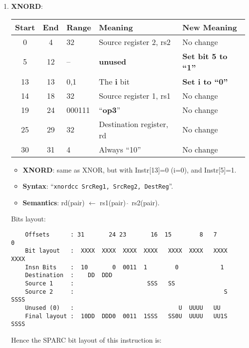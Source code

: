\begin{enumerate}
\item \textbf{XNORD}:\\
  \begin{center}
    \begin{tabular}[p]{|c|c|l|l|l|}
      \hline
      \textbf{Start} & \textbf{End} & \textbf{Range} & \textbf{Meaning} &
                                                                          \textbf{New Meaning}\\
      \hline
      0 & 4 & 32 & Source register 2, rs2 & No change \\
      5 & 12 & -- & \textbf{unused} & \textbf{Set bit 5 to ``1''} \\
      13 & 13 & 0,1 & The \textbf{i} bit & \textbf{Set i to ``0''} \\
      14 & 18 & 32 & Source register 1, rs1 & No change \\
      19 & 24 & 000111 & ``\textbf{op3}'' & No change \\
      25 & 29 & 32 & Destination register, rd & No change \\
      30 & 31 & 4 & Always ``10'' & No change \\
      \hline
    \end{tabular}
  \end{center}
  \begin{itemize}
  \item []\textbf{XNORD}: same as XNOR, but with Instr[13]=0 (i=0), and
    Instr[5]=1.
  \item []\textbf{Syntax}: ``\texttt{xnordcc  SrcReg1, SrcReg2, DestReg}''.
  \item []\textbf{Semantics}: rd(pair) $\leftarrow$ rs1(pair) $\hat{~}$
    rs2(pair).
  \end{itemize}
  Bits layout:
\begin{verbatim}
    Offsets      : 31       24 23       16  15        8   7        0
    Bit layout   :  XXXX  XXXX  XXXX  XXXX   XXXX  XXXX   XXXX  XXXX
    Insn Bits    :  10       0  0011  1        0            1       
    Destination  :    DD  DDD                                       
    Source 1     :                     SSS   SS
    Source 2     :                                           S  SSSS
    Unused (0)   :                              U  UUUU   UU        
    Final layout :  10DD  DDD0  0011  1SSS   SS0U  UUUU   UU1S  SSSS
\end{verbatim}

  Hence the SPARC bit layout of this instruction is:


\end{enumerate}
